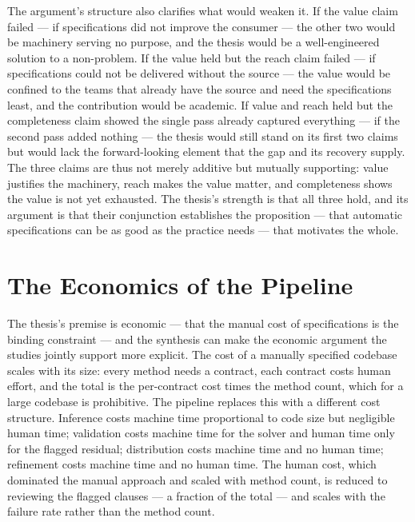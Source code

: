 The argument's structure also clarifies what would weaken it. If the value claim
failed --- if specifications did not improve the consumer --- the other two would be
machinery serving no purpose, and the thesis would be a well-engineered solution to a
non-problem. If the value held but the reach claim failed --- if specifications could
not be delivered without the source --- the value would be confined to the teams that
already have the source and need the specifications least, and the contribution would
be academic. If value and reach held but the completeness claim showed the single
pass already captured everything --- if the second pass added nothing --- the thesis
would still stand on its first two claims but would lack the forward-looking element
that the gap and its recovery supply. The three claims are thus not merely additive
but mutually supporting: value justifies the machinery, reach makes the value
matter, and completeness shows the value is not yet exhausted. The thesis's strength
is that all three hold, and its argument is that their conjunction establishes the
proposition --- that automatic specifications can be as good as the practice
needs --- that motivates the whole.

\section{The Economics of the Pipeline}
\label{sec:syn-economics}

The thesis's premise is economic --- that the manual cost of specifications is the
binding constraint --- and the synthesis can make the economic argument the studies
jointly support more explicit. The cost of a manually specified codebase scales
with its size: every method needs a contract, each contract costs human effort, and
the total is the per-contract cost times the method count, which for a large
codebase is prohibitive. The pipeline replaces this with a different cost
structure. Inference costs machine time proportional to code size but negligible
human time; validation costs machine time for the solver and human time only for the
flagged residual; distribution costs machine time and no human time; refinement
costs machine time and no human time. The human cost, which dominated the manual
approach and scaled with method count, is reduced to reviewing the flagged clauses
--- a fraction of the total --- and scales with the failure rate rather than the
method count.

